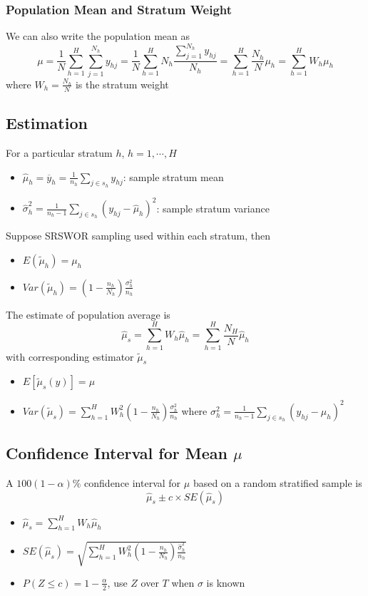 \documentclass[11pt]{article}
\newcommand{\ds}{\displaystyle}
\begin{document}
\subsubsection{Population Mean and Stratum Weight}
We can also write the population mean as 
\[\mu=\frac{1}{N}\sum_{h=1}^{H}\sum_{j=1}^{N_h}y_{hj} = \frac{1}{N}\sum_{h=1}^{H}N_h\frac{\sum_{j=1}^{N_h}y_{hj}}{N_h} = \sum_{h=1}^{H}\frac{N_h}{N}\mu_h = \sum_{h=1}^{H}W_h\mu_h\]
where $W_h=\ds\frac{N_h}{N}$ is the stratum weight
\subsection{Estimation}
For a particular stratum $h$, $h=1,\cdots,H$ 
\begin{itemize}
    \item $\hat{\mu}_h = \overline{y}_h = \frac{1}{n_h}\sum_{j\in s_h}y_{hj}$: sample stratum mean 
    \item $\hat{\sigma}^2_h = \frac{1}{n_h-1}\sum_{j\in s_h}(y_{hj}-\hat{\mu}_h)^2$: sample stratum variance
\end{itemize}
Suppose SRSWOR sampling used within each stratum, then 
\begin{itemize}
    \item $E(\tilde{\mu}_h)=\mu_h$
    \item $Var(\tilde{\mu}_h)=(1-\frac{n_h}{N_h})\frac{\sigma^2_h}{n_h}$
\end{itemize}
The estimate of population average is 
\[\hat{\mu}_s=\sum_{h=1}^{H}W_h\hat{\mu}_h = \sum_{h=1}^{H}\frac{N_H}{N}\hat{\mu}_h\]
with corresponding estimator $\tilde{\mu}_s$
\begin{itemize}
    \item $E[\tilde{\mu}_s(y)]=\mu$
    \item $Var(\tilde{\mu}_s) = \ds\sum_{h=1}^{H}W_h^2(1-\frac{n_h}{N_h})\frac{\sigma_h^2}{n_h}$ where $\sigma_h^2 = \ds\frac{1}{n_h-1}\sum_{j\in s_h}(y_{hj}-\mu_h)^2$
\end{itemize}
\subsection{Confidence Interval for Mean $\mu$}
A $100(1-\alpha)\%$ confidence interval for $\mu$ based on a random stratified sample is 
\[\hat{\mu}_s\pm c\times SE(\hat{\mu}_s)\]
\begin{itemize}
    \item $\hat{\mu}_s=\sum_{h=1}^{H}W_h\hat{\mu}_h$
    \item $SE(\hat{\mu}_s)=\sqrt{\ds\sum_{h=1}^{H}W_h^2(1-\frac{n_h}{N_h})\frac{\hat{\sigma}_h^2}{n_h}}$
    \item $P(Z\leq c)=1-\frac{\alpha}{2}$, use $Z$ over $T$ when $\sigma$ is known 
\end{itemize}
\end{document}
